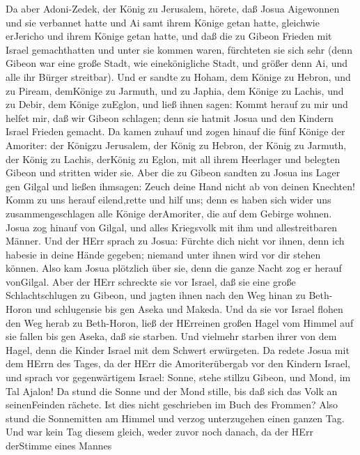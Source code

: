 Da aber Adoni-Zedek, der König zu Jerusalem, hörete, daß
Josua Aigewonnen und sie verbannet hatte und Ai samt ihrem Könige getan
hatte, gleichwie erJericho und ihrem Könige getan hatte, und daß die zu
Gibeon Frieden mit Israel gemachthatten und unter sie kommen waren,
 fürchteten sie sich sehr (denn Gibeon war eine große Stadt,
wie einekönigliche Stadt, und größer denn Ai, und alle ihr Bürger
streitbar).  Und er sandte zu Hoham, dem Könige zu Hebron,
und zu Piream, demKönige zu Jarmuth, und zu Japhia, dem Könige zu
Lachis, und zu Debir, dem Könige zuEglon, und ließ ihnen sagen:
 Kommt herauf zu mir und helfet mir, daß wir Gibeon
schlagen; denn sie hatmit Josua und den Kindern Israel Frieden gemacht.
 Da kamen zuhauf und zogen hinauf die fünf Könige der
Amoriter: der Königzu Jerusalem, der König zu Hebron, der König zu
Jarmuth, der König zu Lachis, derKönig zu Eglon, mit all ihrem Heerlager
und belegten Gibeon und stritten wider sie.  Aber die zu
Gibeon sandten zu Josua ins Lager gen Gilgal und ließen ihmsagen: Zeuch
deine Hand nicht ab von deinen Knechten! Komm zu uns herauf eilend,rette
und hilf uns; denn es haben sich wider uns zusammengeschlagen alle
Könige derAmoriter, die auf dem Gebirge wohnen.  Josua zog
hinauf von Gilgal, und alles Kriegsvolk mit ihm und allestreitbaren
Männer.  Und der HErr sprach zu Josua: Fürchte dich nicht
vor ihnen, denn ich habesie in deine Hände gegeben; niemand unter ihnen
wird vor dir stehen können.  Also kam Josua plötzlich über
sie, denn die ganze Nacht zog er herauf vonGilgal.  Aber
der HErr schreckte sie vor Israel, daß sie eine große Schlachtschlugen
zu Gibeon, und jagten ihnen nach den Weg hinan zu Beth-Horon und
schlugensie bis gen Aseka und Makeda.  Und da sie vor
Israel flohen den Weg herab zu Beth-Horon, ließ der HErreinen großen
Hagel vom Himmel auf sie fallen bis gen Aseka, daß sie starben. Und
vielmehr starben ihrer von dem Hagel, denn die Kinder Israel mit dem
Schwert erwürgeten.  Da redete Josua mit dem HErrn des
Tages, da der HErr die Amoriterübergab vor den Kindern Israel, und
sprach vor gegenwärtigem Israel: Sonne, stehe stillzu Gibeon, und Mond,
im Tal Ajalon!  Da stund die Sonne und der Mond stille, bis
daß sich das Volk an seinenFeinden rächete. Ist dies nicht geschrieben
im Buch des Frommen? Also stund die Sonnemitten am Himmel und verzog
unterzugehen einen ganzen Tag.  Und war kein Tag diesem
gleich, weder zuvor noch danach, da der HErr derStimme eines Mannes
